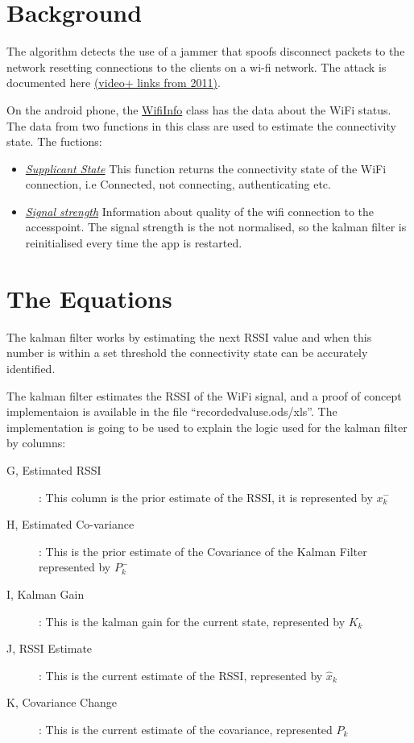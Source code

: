 \documentclass[a4paper,10pt]{article}
\title{}
\author{}
\begin{document}
\section{Background}
The algorithm detects the use of a jammer that spoofs disconnect packets to the network resetting connections to the clients on a wi-fi network. The attack is documented here \href{http://hackaday.com/2011/10/04/wifi-jamming-via-deauthentication-packets/}{(video+ links from 2011)}. 

On the android phone, the \href{http://developer.android.com/reference/android/net/wifi/WifiInfo.html}{WifiInfo} class has the data about the WiFi status.
The data from two functions in this class are used to estimate the connectivity state.
The fuctions:
\begin{itemize}
 \item \emph{\href{http://developer.android.com/reference/android/net/wifi/WifiInfo.html\#getSupplicantState()}{Supplicant State}} This function returns the connectivity state of the WiFi connection, i.e Connected, not connecting, authenticating etc.
 \item \emph{\href{http://developer.android.com/reference/android/net/wifi/WifiInfo.html\#getRssi()}{Signal strength}} Information about quality of the wifi connection to the accesspoint. The signal strength is the not normalised, so the kalman filter is reinitialised every time the app is restarted.
\end{itemize}

\section{The Equations}
The kalman filter works by estimating the next RSSI value and when this number is within a set threshold the connectivity state can be accurately identified.

The kalman filter estimates the RSSI of the WiFi signal, and a proof of concept implementaion is available in the file ``recordedvaluse.ods/xls''. The implementation is going to be used to explain the logic used for the kalman filter by columns:

\begin{description}
 \item [G, Estimated RSSI]: This column is the prior estimate of the RSSI, it is represented by $x^-_k$ 
 \item [H, Estimated Co-variance]: This is the prior estimate of the Covariance of the Kalman Filter represented by $P^-_k$
 \item [I, Kalman Gain]: This is the kalman gain for the current state, represented by $K_k$
 \item [J, RSSI Estimate]: This is the current estimate of the RSSI, represented by $\hat{x}_k$
 \item [K, Covariance Change]: This is the current estimate of the covariance, represented $P_k$
\end{description}
\end{document}
